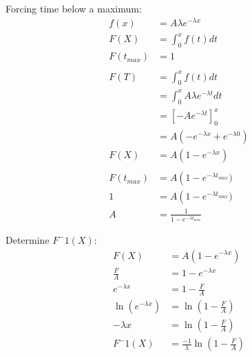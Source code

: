 \documentclass[12pt]{article}
\begin{document}
Forcing time below a maximum:
\begin{align*}
	f(x) &= A \lambda e^{-\lambda x} \\
	F(X) &= \int_{0}^{x} f(t) dt \\
	F(t_{max}) &= 1 \\
	\\
	F(T) &= \int_{0}^{x} f(t) dt \\
		&= \int_{0}^{x} A \lambda e^{-\lambda t} dt \\
		&= \left[-A e^{-\lambda t}\right]_{0}^{x} \\
		&= A\left(-e^{-\lambda x} + e^{-\lambda 0}\right) \\
	F(X) &= A\left(1 - e^{-\lambda x}\right) \\
	\\
	F(t_{max}) &= A\left(1 - e^{-\lambda t_{max}}) \\
	1 &= A\left(1 - e^{-\lambda t_{max}}) \\
	A &= \frac{1}{1 - e^{-\lambda t_{max}}}
\end{align*}

Determine $F^-1(X)$:
\begin{align*}
	F(X) &= A\left(1 - e^{-\lambda x}\right) \\
	\frac{F}{A} &= 1 - e^{-\lambda x} \\
	e^{-\lambda x} &= 1 - \frac{F}{A} \\
	\ln\left(e^{-\lambda x}\right) &= \ln\left(1 - \frac{F}{A}\right) \\
	-\lambda x &= \ln\left(1 - \frac{F}{A}\right) \\
	F^-1(X) &= \frac{-1}{\lambda}\ln\left(1 - \frac{F}{A}\right) \\
\end{align*}
\end{document}
